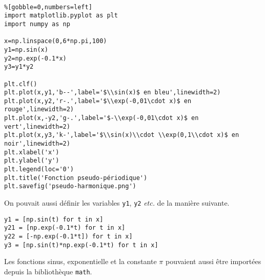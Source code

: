 \exer{[PLT-001]}
\setcounter{numques}{0}~\\


\begin{lstlisting}%[gobble=0,numbers=left]
import matplotlib.pyplot as plt
import numpy as np

x=np.linspace(0,6*np.pi,100)
y1=np.sin(x)
y2=np.exp(-0.1*x)
y3=y1*y2

plt.clf()
plt.plot(x,y1,'b--',label='$\\sin(x)$ en bleu',linewidth=2)
plt.plot(x,y2,'r-.',label='$\\exp(-0,01\cdot x)$ en rouge',linewidth=2)
plt.plot(x,-y2,'g-.',label='$-\\exp(-0,01\cdot x)$ en vert',linewidth=2)
plt.plot(x,y3,'k-',label='$\\sin(x)\\cdot \\exp(0,1\\cdot x)$ en noir',linewidth=2)
plt.xlabel('x')
plt.ylabel('y')
plt.legend(loc='0')
plt.title('Fonction pseudo-périodique')
plt.savefig('pseudo-harmonique.png')
\end{lstlisting}
On pouvait aussi définir les variables \texttt{y1}, \texttt{y2} \emph{etc.} de la manière suivante. 
\begin{lstlisting}
y1 = [np.sin(t) for t in x]
y21 = [np.exp(-0.1*t) for t in x]
y22 = [-np.exp(-0.1*t]) for t in x]
y3 = [np.sin(t)*np.exp(-0.1*t) for t in x]
\end{lstlisting}
Les fonctions sinus, exponentielle et la constante $\pi$ pouvaient aussi être importées depuis la bibliothèque \texttt{math}.